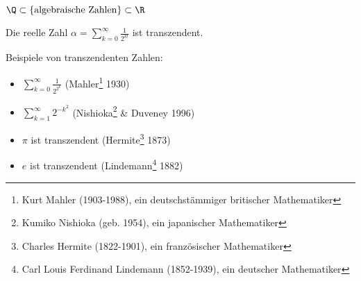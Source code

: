 \begin{rem*}
	$\Q \subset \{\text{algebraische Zahlen}\} \subset \R$
\end{rem*}

\begin{thm}\autolabel
	Die reelle Zahl 
	\( \alpha = \sum_{k=0}^\infty \frac{1}{2^{k!}} \)
	ist transzendent.
\end{thm}

Beispiele von transzendenten Zahlen:
\begin{itemize}
	\item \( \sum_{k=0}^\infty \frac{1}{2^{2^k}} \) (Mahler\footnote{Kurt Mahler (1903-1988), ein deutschstämmiger britischer Mathematiker} 1930)
	\item \( \sum_{k=1}^\infty 2^{-k^2} \) (Nishioka\footnote{Kumiko Nishioka (geb. 1954), ein japanischer Mathematiker} \& Duveney 1996)
	\item $\pi$ ist transzendent (Hermite\footnote{Charles Hermite (1822-1901), ein französischer Mathematiker} 1873)
	\item $e$ ist transzendent (Lindemann\footnote{Carl Louis Ferdinand Lindemann (1852-1939), ein deutscher Mathematiker} 1882)
\end{itemize}